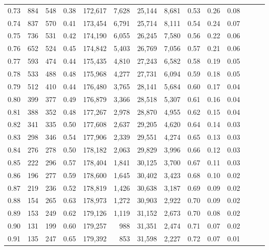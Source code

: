 \begin{tabular}{rrrrrrrrrrrrrr}
0.73 &    884 &  548 &  0.38 &  172,617 &    7,628 &  25,144 &   8,681 &  0.53 &  0.26 &      0.08 \\
0.74 &    837 &  570 &  0.41 &  173,454 &    6,791 &  25,714 &   8,111 &  0.54 &  0.24 &      0.07 \\
0.75 &    736 &  531 &  0.42 &  174,190 &    6,055 &  26,245 &   7,580 &  0.56 &  0.22 &      0.06 \\
0.76 &    652 &  524 &  0.45 &  174,842 &    5,403 &  26,769 &   7,056 &  0.57 &  0.21 &      0.06 \\
0.77 &    593 &  474 &  0.44 &  175,435 &    4,810 &  27,243 &   6,582 &  0.58 &  0.19 &      0.05 \\
0.78 &    533 &  488 &  0.48 &  175,968 &    4,277 &  27,731 &   6,094 &  0.59 &  0.18 &      0.05 \\
0.79 &    512 &  410 &  0.44 &  176,480 &    3,765 &  28,141 &   5,684 &  0.60 &  0.17 &      0.04 \\
0.80 &    399 &  377 &  0.49 &  176,879 &    3,366 &  28,518 &   5,307 &  0.61 &  0.16 &      0.04 \\
0.81 &    388 &  352 &  0.48 &  177,267 &    2,978 &  28,870 &   4,955 &  0.62 &  0.15 &      0.04 \\
0.82 &    341 &  335 &  0.50 &  177,608 &    2,637 &  29,205 &   4,620 &  0.64 &  0.14 &      0.03 \\
0.83 &    298 &  346 &  0.54 &  177,906 &    2,339 &  29,551 &   4,274 &  0.65 &  0.13 &      0.03 \\
0.84 &    276 &  278 &  0.50 &  178,182 &    2,063 &  29,829 &   3,996 &  0.66 &  0.12 &      0.03 \\
0.85 &    222 &  296 &  0.57 &  178,404 &    1,841 &  30,125 &   3,700 &  0.67 &  0.11 &      0.03 \\
0.86 &    196 &  277 &  0.59 &  178,600 &    1,645 &  30,402 &   3,423 &  0.68 &  0.10 &      0.02 \\
0.87 &    219 &  236 &  0.52 &  178,819 &    1,426 &  30,638 &   3,187 &  0.69 &  0.09 &      0.02 \\
0.88 &    154 &  265 &  0.63 &  178,973 &    1,272 &  30,903 &   2,922 &  0.70 &  0.09 &      0.02 \\
0.89 &    153 &  249 &  0.62 &  179,126 &    1,119 &  31,152 &   2,673 &  0.70 &  0.08 &      0.02 \\
0.90 &    131 &  199 &  0.60 &  179,257 &      988 &  31,351 &   2,474 &  0.71 &  0.07 &      0.02 \\
0.91 &    135 &  247 &  0.65 &  179,392 &      853 &  31,598 &   2,227 &  0.72 &  0.07 &      0.01 \\

\end{tabular}
